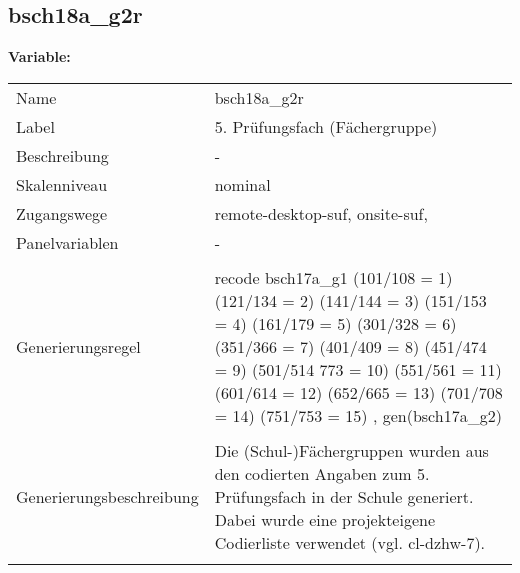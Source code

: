 	
	
	\subsection{bsch18a\_g2r}
	\label{subSection:bsch18a_g2r}

	\noindent\textbf{Variable:}\\
		\begin{tabular}{lL{11.3cm}}
			\label{tableVariable:bsch18a_g2r}
			Name & bsch18a\_g2r \\
			Label & 5. Prüfungsfach (Fächergruppe) \\
			Beschreibung & - \\
			Skalenniveau & nominal \\
			Zugangswege &
				remote-desktop-suf,
				onsite-suf,
 \\
			Panelvariablen & -
			 \\
			 \\
					Generierungsregel & recode bsch17a\_g1 (101/108 = 1) (121/134 = 2) (141/144 = 3) 
(151/153 = 4) (161/179 = 5) (301/328 = 6) (351/366 = 7) 
(401/409 = 8) (451/474 = 9) (501/514 773 = 10) (551/561 = 11) 
(601/614 = 12) (652/665 = 13) (701/708 = 14) (751/753 = 15)
, gen(bsch17a\_g2) \\
				 \\
					Generierungsbeschreibung & Die (Schul-)Fächergruppen wurden aus den codierten Angaben zum 5. Prüfungsfach in der Schule generiert. Dabei wurde eine projekteigene Codierliste verwendet (vgl. cl-dzhw-7).
				 \\	
			 \\
		\end{tabular}






